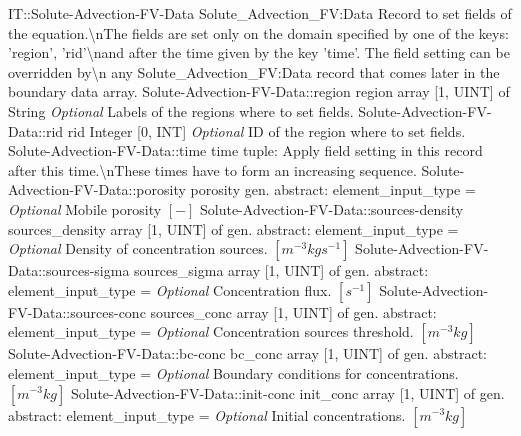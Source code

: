 \begin{RecordType}
	{IT::Solute-Advection-FV-Data}
	{Solute{\_}Advection{\_}FV:Data}
	{}%
	{}%
	{{{Record to set fields of the equation.{\textbackslash}nThe fields are set only on the domain specified by one of the keys: 'region', 'rid'{\textbackslash}nand after the time given by the key 'time'. The field setting can be overridden by{\textbackslash}n any Solute{\_}Advection{\_}FV:Data record that comes later in the boundary data array.}%
}}
		\RecKey
			{Solute-Advection-FV-Data::region}
			{region}
			{{array [1, UINT] of }{String}}{}
			{ \it{Optional}}
			{{{Labels of the regions where to set fields. }%
}}
		\RecKey
			{Solute-Advection-FV-Data::rid}
			{rid}
			{{Integer [0, INT]}}{}
			{ \it{Optional}}
			{{{ID of the region where to set fields.}%
}}
		\RecKey
			{Solute-Advection-FV-Data::time}
			{time}
			{{tuple: }}{}
			{ }
			{{{Apply field setting in this record after this time.{\textbackslash}nThese times have to form an increasing sequence.}%
}}
		\RecKey
			{Solute-Advection-FV-Data::porosity}
			{porosity}
			{{gen. abstract: }}{{element{\_}input{\_}type}{ = }}
			{ \it{Optional}}
			{{{Mobile porosity }{$[-]$}%
}}
		\RecKey
			{Solute-Advection-FV-Data::sources-density}
			{sources{\_}density}
			{{array [1, UINT] of }{gen. abstract: }}{{element{\_}input{\_}type}{ = }}
			{ \it{Optional}}
			{{{Density of concentration sources. }{$[m^{-3}kgs^{-1}]$}%
}}
		\RecKey
			{Solute-Advection-FV-Data::sources-sigma}
			{sources{\_}sigma}
			{{array [1, UINT] of }{gen. abstract: }}{{element{\_}input{\_}type}{ = }}
			{ \it{Optional}}
			{{{Concentration flux. }{$[s^{-1}]$}%
}}
		\RecKey
			{Solute-Advection-FV-Data::sources-conc}
			{sources{\_}conc}
			{{array [1, UINT] of }{gen. abstract: }}{{element{\_}input{\_}type}{ = }}
			{ \it{Optional}}
			{{{Concentration sources threshold. }{$[m^{-3}kg]$}%
}}
		\RecKey
			{Solute-Advection-FV-Data::bc-conc}
			{bc{\_}conc}
			{{array [1, UINT] of }{gen. abstract: }}{{element{\_}input{\_}type}{ = }}
			{ \it{Optional}}
			{{{Boundary conditions for concentrations. }{$[m^{-3}kg]$}%
}}
		\RecKey
			{Solute-Advection-FV-Data::init-conc}
			{init{\_}conc}
			{{array [1, UINT] of }{gen. abstract: }}{{element{\_}input{\_}type}{ = }}
			{ \it{Optional}}
			{{{Initial concentrations. }{$[m^{-3}kg]$}%
}}
\end{RecordType}
